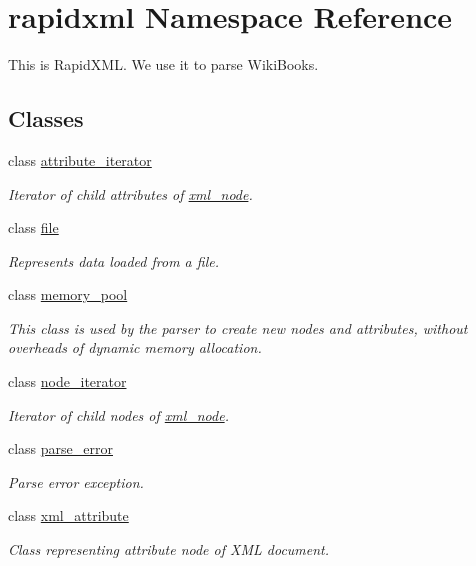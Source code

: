 \hypertarget{namespacerapidxml}{}\section{rapidxml Namespace Reference}
\label{namespacerapidxml}


This is Rapid\+X\+M\+L. We use it to parse Wiki\+Books.  


\subsection*{Classes}
\begin{DoxyCompactItemize}
\item 
class \hyperlink{classrapidxml_1_1attribute__iterator}{attribute\+\_\+iterator}
\begin{DoxyCompactList}\small\item\em Iterator of child attributes of \hyperlink{classrapidxml_1_1xml__node}{xml\+\_\+node}. \end{DoxyCompactList}\item 
class \hyperlink{classrapidxml_1_1file}{file}
\begin{DoxyCompactList}\small\item\em Represents data loaded from a file. \end{DoxyCompactList}\item 
class \hyperlink{classrapidxml_1_1memory__pool}{memory\+\_\+pool}
\begin{DoxyCompactList}\small\item\em This class is used by the parser to create new nodes and attributes, without overheads of dynamic memory allocation. \end{DoxyCompactList}\item 
class \hyperlink{classrapidxml_1_1node__iterator}{node\+\_\+iterator}
\begin{DoxyCompactList}\small\item\em Iterator of child nodes of \hyperlink{classrapidxml_1_1xml__node}{xml\+\_\+node}. \end{DoxyCompactList}\item 
class \hyperlink{classrapidxml_1_1parse__error}{parse\+\_\+error}
\begin{DoxyCompactList}\small\item\em Parse error exception. \end{DoxyCompactList}\item 
class \hyperlink{classrapidxml_1_1xml__attribute}{xml\+\_\+attribute}
\begin{DoxyCompactList}\small\item\em Class representing attribute node of X\+M\+L document. \end{DoxyCompactList}\item 

\end{DoxyCompactItemize}
